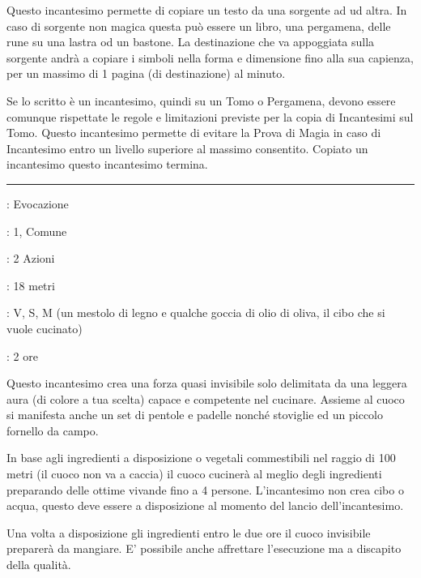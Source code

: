 \begin{multicols}{2}
Questo incantesimo permette di copiare un testo da una sorgente ad ud altra. In caso di sorgente non magica questa può essere un libro, una pergamena, delle rune su una lastra od un bastone. La destinazione che va appoggiata sulla sorgente andrà a copiare i simboli nella forma e dimensione fino alla sua capienza, per un massimo di 1 pagina (di destinazione) al minuto.

Se lo scritto è un incantesimo, quindi su un Tomo o Pergamena, devono essere comunque rispettate le regole e limitazioni previste per la copia di Incantesimi sul Tomo. Questo incantesimo permette di evitare la Prova di Magia in caso di Incantesimo entro un livello superiore al massimo consentito. Copiato un incantesimo questo incantesimo termina.

\smallskip\noindent\rule{\linewidth}{2pt} \hypertarget{Cuoco Invisibile}{}\medskip{}
\noindent
\begin{description}[noitemsep, topsep=0pt, parsep=0pt, partopsep=0pt, leftmargin=0cm, labelwidth=2.8cm]
	\item[\textbf{Lista di Magia}]: Evocazione
	\item[\textbf{Livello}]: 1, Comune
	\item[\textbf{T. di Lancio}]: 2 Azioni
	\item[\textbf{Gittata}]: 18 metri
	\item[\textbf{Componenti}]: V, S, M (un mestolo di legno e qualche goccia di olio di oliva, il cibo che si vuole cucinato)
	\item[\textbf{Durata}]: 2 ore
\end{description}

Questo incantesimo crea una forza quasi invisibile solo delimitata da una leggera aura (di colore a tua scelta) capace e competente nel cucinare. Assieme al cuoco si manifesta anche un set di pentole e padelle nonché stoviglie ed un piccolo fornello da campo.

In base agli ingredienti a disposizione o vegetali commestibili nel raggio di 100 metri (il cuoco non va a caccia) il cuoco cucinerà al meglio degli ingredienti preparando delle ottime vivande fino a 4 persone. L'incantesimo non crea cibo o acqua, questo deve essere a disposizione al momento del lancio dell'incantesimo.

Una volta a disposizione gli ingredienti entro le due ore il cuoco invisibile preparerà da mangiare. E' possibile anche affrettare l'esecuzione ma a discapito della qualità.


\end{multicols}
